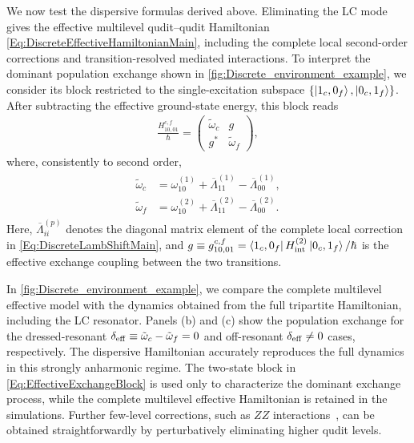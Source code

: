 \documentclass[prx,aps,twocolumn,article]{revtex4-2}
\begin{document}
We now test the dispersive formulas derived above. Eliminating the LC
mode gives the effective multilevel qudit--qudit Hamiltonian
\cref{Eq:DiscreteEffectiveHamiltonianMain}, including the complete
local second-order corrections and transition-resolved mediated
interactions. To interpret the dominant population exchange shown in
\cref{fig:Discrete_environment_example}, we consider its block restricted to the
single-excitation subspace
$\{\ket{1_c,0_f},\ket{0_c,1_f}\}$. After subtracting the effective
ground-state energy, this block reads
\begin{align}
    \frac{H_{10,01}^{c,f}}{\hbar}
    =
    \begin{pmatrix}
        \tilde{\omega}_c & g  \\
        g^* & \tilde{\omega}_f
    \end{pmatrix},
\label{Eq:EffectiveExchangeBlock}
\end{align}
where, consistently to second order,
\begin{align}
\begin{aligned}
    \tilde{\omega}_c
    &=
    \omega_{10}^{(1)}
    +
    \overline{\Lambda}_{11}^{(1)}
    -
    \overline{\Lambda}_{00}^{(1)},
    \\
    \tilde{\omega}_f
    &=
    \omega_{10}^{(2)}
    +
     \overline{\Lambda}_{11}^{(2)}
    -
     \overline{\Lambda}_{00}^{(2)}.
\end{aligned}
\label{Eq:DressedTransitionFrequenciesExample}
\end{align}
Here, $\overline{\Lambda}_{ii}^{(p)}$ denotes the diagonal matrix
element of the complete local correction in
\cref{Eq:DiscreteLambShiftMain}, and
$g\equiv g_{10,01}^{c,f}
=\bra{1_c,0_f}H_{\rm int}^{(2)}\ket{0_c,1_f}/\hbar$
is the effective exchange coupling between the two transitions.

In \cref{fig:Discrete_environment_example}, we compare the complete multilevel effective model with the dynamics obtained from the full tripartite Hamiltonian, including the LC resonator. Panels (b) and (c) show the population exchange for the dressed-resonant $\delta_{\rm eff}\equiv\tilde{\omega}_c-\tilde{\omega}_f=0$
and off-resonant $\delta_{\rm eff}\neq0$ cases, respectively. The dispersive Hamiltonian accurately reproduces the full dynamics in this strongly anharmonic regime. The two-state block in
\cref{Eq:EffectiveExchangeBlock} is used only to characterize the dominant exchange process, while the complete multilevel effective Hamiltonian is retained in the simulations. Further few-level corrections, such as $ZZ$ interactions~\cite{Solgun:2022}, can be obtained straightforwardly by perturbatively eliminating higher qudit levels.
\end{document}
